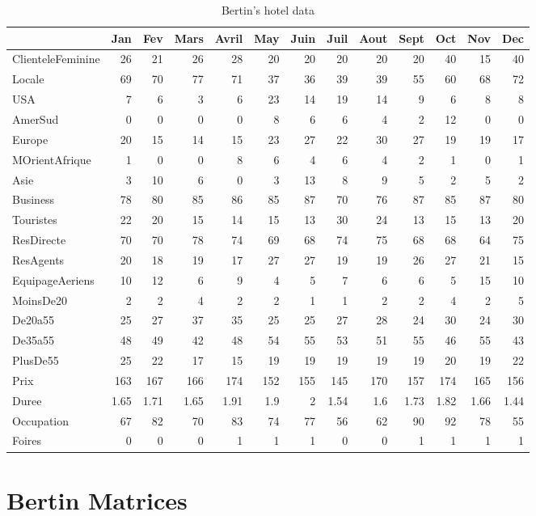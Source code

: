 \documentclass[nogin, dvips,12pt,a4paper,twoside]{amsart}
\begin{document}
\begin{table}[htdp]
\begin{center}%
\tiny{
\begin{tabular}{|l|r|r|r|r|r|r|r|r|r|r|r|r|}
\hline
&Jan&Fev&Mars&Avril&May&Juin&Juil&Aout&Sept&Oct&Nov&Dec\\
\hline
ClienteleFeminine&26&21&26&28&20&20&20&20&20&40&15&40\\
Locale&69&70&77&71&37&36&39&39&55&60&68&72\\
USA&7&6&3&6&23&14&19&14&9&6&8&8\\
AmerSud&0&0&0&0&8&6&6&4&2&12&0&0\\
Europe&20&15&14&15&23&27&22&30&27&19&19&17\\
MOrientAfrique&1&0&0&8&6&4&6&4&2&1&0&1\\
Asie&3&10&6&0&3&13&8&9&5&2&5&2\\
Business&78&80&85&86&85&87&70&76&87&85&87&80\\
Touristes&22&20&15&14&15&13&30&24&13&15&13&20\\
ResDirecte&70&70&78&74&69&68&74&75&68&68&64&75\\
ResAgents&20&18&19&17&27&27&19&19&26&27&21&15\\
EquipageAeriens&10&12&6&9&4&5&7&6&6&5&15&10\\
MoinsDe20&2&2&4&2&2&1&1&2&2&4&2&5\\
De20a55&25&27&37&35&25&25&27&28&24&30&24&30\\
De35a55&48&49&42&48&54&55&53&51&55&46&55&43\\
PlusDe55&25&22&17&15&19&19&19&19&19&20&19&22\\
Prix&163&167&166&174&152&155&145&170&157&174&165&156\\
Duree&1.65&1.71&1.65&1.91&1.9&2&1.54&1.6&1.73&1.82&1.66&1.44\\
Occupation&67&82&70&83&74&77&56&62&90&92&78&55\\
Foires&0&0&0&1&1&1&0&0&1&1&1&1\\
\hline
\end{tabular}
}
\end{center}
\caption{Bertin's hotel data}
\label{tab:hotel}
\end{table}%

\section{Bertin Matrices}
\end{document}
